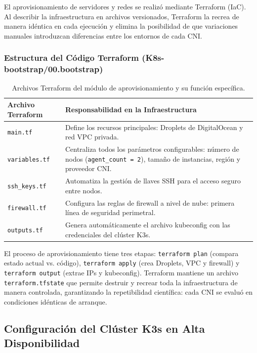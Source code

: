 El aprovisionamiento de servidores y redes se realizó mediante Terraform (IaC). Al describir la infraestructura en archivos versionados, Terraform la recrea de manera idéntica en cada ejecución y elimina la posibilidad de que variaciones manuales introduzcan diferencias entre los entornos de cada CNI.

\subsubsection{Estructura del Código Terraform (K8s-bootstrap/00.bootstrap)}

\begin{table}[htbp]
\centering
\scriptsize
\renewcommand{\arraystretch}{1.25}
\setlength{\tabcolsep}{4pt}
\caption{Archivos Terraform del módulo de aprovisionamiento y su función específica.}
\label{tab:terraform-aprovisionamiento}
\begin{tabularx}{\textwidth}{|l|Y|}
\hline
\textbf{Archivo Terraform} & \textbf{Responsabilidad en la Infraestructura} \\
\hline
\texttt{main.tf} & Define los recursos principales: Droplets de DigitalOcean y red VPC privada. \\
\hline
\texttt{variables.tf} & Centraliza todos los parámetros configurables: número de nodos (\texttt{agent\_count = 2}), tamaño de instancias, región y proveedor CNI. \\
\hline
\texttt{ssh\_keys.tf} & Automatiza la gestión de llaves SSH para el acceso seguro entre nodos. \\
\hline
\texttt{firewall.tf} & Configura las reglas de firewall a nivel de nube: primera línea de seguridad perimetral. \\
\hline
\texttt{outputs.tf} & Genera automáticamente el archivo kubeconfig con las credenciales del clúster K3s. \\
\hline
\end{tabularx}
\end{table}

El proceso de aprovisionamiento tiene tres etapas: \texttt{terraform plan} (compara estado actual vs. código), \texttt{terraform apply} (crea Droplets, VPC y firewall) y \texttt{terraform output} (extrae IPs y kubeconfig). Terraform mantiene un archivo \texttt{terraform.tfstate} que permite destruir y recrear toda la infraestructura de manera controlada, garantizando la repetibilidad científica: cada CNI se evaluó en condiciones idénticas de arranque.

\subsection{Configuración del Clúster K3s en Alta Disponibilidad}

